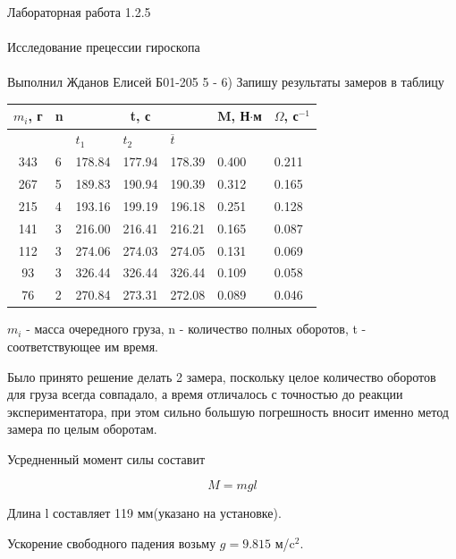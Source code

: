 \documentclass{astroedu-lab}
\begin{document}
\begin{problem}{\huge Лабораторная работа 1.2.5\\\\Исследование прецессии гироскопа\\\\Выполнил Жданов Елисей Б01-205}
5 - 6) Запишу результаты замеров в таблицу

\begin{center}
\begin{tabular}[t]{|c|l|l|l|l|l|l|}
\hline
$m_i$, г & n & \multicolumn{3}{|c|}{t, с} & M, Н$\cdot$м & $\Omega$, с$^{-1}$ \\
\hline
&& $t_1$ & $t_2$ & $\overline{t}$ && \\
\hline
343 & 6 & 178.84 & 177.94 & 178.39 & 0.400 & 0.211 \\
267 & 5 & 189.83 & 190.94 & 190.39 & 0.312 & 0.165 \\
215 & 4 & 193.16 & 199.19 & 196.18 & 0.251 & 0.128 \\
141 & 3 & 216.00 & 216.41 & 216.21 & 0.165 & 0.087 \\
112 & 3 & 274.06 & 274.03 & 274.05 & 0.131 & 0.069 \\
93  & 3 & 326.44 & 326.44 & 326.44 & 0.109 & 0.058 \\
76  & 2 & 270.84 & 273.31 & 272.08 & 0.089 & 0.046 \\
\hline
\end{tabular}
\end{center} 

$m_i$ - масса очередного груза, n - количество полных оборотов, t - соответствующее им время.

Было принято решение делать 2 замера, поскольку целое количество оборотов для груза всегда совпадало, а время отличалось с точностью до реакции экспериментатора, при этом сильно большую погрешность вносит именно метод замера по целым оборотам.

Усредненный момент силы составит

\begin{equation}
	M = m g l
\end{equation}

Длина l составляет 119 мм(указано на установке).

Ускорение свободного падения возьму $g = 9.815$ м/c$^2$.

\begin{center}
\end{center}


\end{problem}
\end{document}
